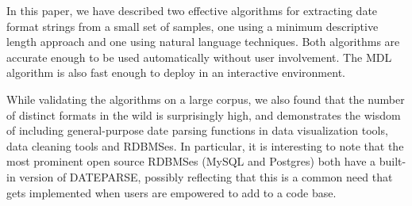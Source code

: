 In this paper, we have described two effective algorithms for extracting date format strings from a small set of samples, one using a minimum descriptive length approach and one using natural language techniques. Both algorithms are accurate enough to be used automatically without user involvement. The MDL algorithm is also fast enough to deploy in an interactive environment.

While validating the algorithms on a large corpus, we also found that the number of distinct formats in the wild is surprisingly high, and demonstrates the wisdom of including general-purpose date parsing functions in data visualization tools, data cleaning tools and RDBMSes. In particular, it is interesting to note that the most prominent open source RDBMSes (MySQL and Postgres) both have a built-in version of DATEPARSE, possibly reflecting that this is a common need that gets implemented when users are empowered to add to a code base.

